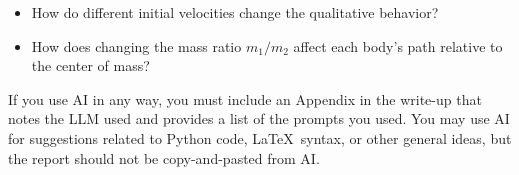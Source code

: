 \documentclass[article, 11pt]{article}
\begin{document}
\vspace{-.28cm}
\noindent \hrulefill


\begin{itemize}
\item How do different initial velocities change the qualitative behavior?
\item How does changing the mass ratio $m_1/m_2$ affect each body's path relative to the center of mass?
\end{itemize}

\vspace{.35cm}

\noindent {}

\vspace{-.35cm}
\noindent \hrulefill

If you use AI in any way, you must include an Appendix in the write-up that notes the LLM used and provides a list of the prompts you used. You may use AI for suggestions related to Python code, \LaTeX\, syntax, or other general ideas, but the report should not be copy-and-pasted from AI.

\pagebreak
\end{document}
